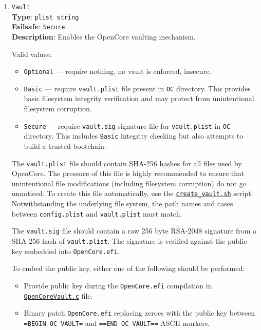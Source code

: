 \documentclass[]{article}
\providecommand{\tightlist}{%
  \setlength{\itemsep}{0pt}\setlength{\parskip}{0pt}}
\begin{document}
\begin{enumerate}
  For more details on how to configure Apple Secure Boot with UEFI Secure Boot,
  refer to the \hyperref[uefisecureboot]{UEFI Secure Boot} section.

\item \label{securevaulting}
  \texttt{Vault}\\
  \textbf{Type}: \texttt{plist\ string}\\
  \textbf{Failsafe}: \texttt{Secure}\\
  \textbf{Description}: Enables the OpenCore vaulting mechanism.

  Valid values:

  \begin{itemize}
  \tightlist
  \item \texttt{Optional} --- require nothing, no vault is enforced, insecure.
  \item \texttt{Basic} --- require \texttt{vault.plist} file present
  in \texttt{OC} directory. This provides basic filesystem integrity
  verification and may protect from unintentional filesystem corruption.
  \item \texttt{Secure} --- require \texttt{vault.sig} signature file for
  \texttt{vault.plist} in \texttt{OC} directory. This includes \texttt{Basic}
  integrity checking but also attempts to build a trusted bootchain.
  \end{itemize}

  The \texttt{vault.plist} file should contain SHA-256 hashes for all files used by OpenCore.
  The presence of this file is highly recommended to ensure that unintentional file modifications
  (including filesystem corruption) do not go unnoticed. To create this file automatically, use the
  \href{https://github.com/acidanthera/OpenCorePkg/tree/master/Utilities/CreateVault}{\texttt{create\_vault.sh}}
  script. Notwithstanding the underlying file system, the path names and cases between \texttt{config.plist}
  and \texttt{vault.plist} must match.

  The \texttt{vault.sig} file should contain a raw 256 byte RSA-2048 signature from a SHA-256
  hash of \texttt{vault.plist}. The signature is verified against the public key embedded
  into \texttt{OpenCore.efi}.

  To embed the public key, either one of the following should be performed:

  \begin{itemize}
  \tightlist
  \item Provide public key during the \texttt{OpenCore.efi} compilation in
  \href{https://github.com/acidanthera/OpenCorePkg/blob/master/Library/OcMainLib/OpenCoreVault.c}{\texttt{OpenCoreVault.c}} file.
  \item Binary patch \texttt{OpenCore.efi} replacing zeroes with the public key
  between \texttt{=BEGIN OC VAULT=} and \texttt{==END OC VAULT==} ASCII markers.
  \end{itemize}


\end{enumerate}
\end{document}
